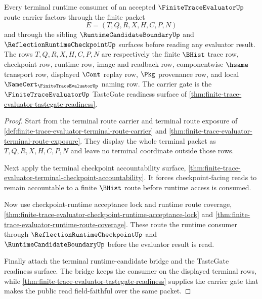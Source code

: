 \begin{theorem}
\label{thm:finite-trace-evaluator-terminal-runtime-consumer-factorization}
Every terminal runtime consumer of an accepted $\FiniteTraceEvaluatorUp$
route carrier factors through the finite packet
$$
E=(T,Q,R,X,H,C,P,N)
$$
and through the sibling $\RuntimeCandidateBoundaryUp$ and
$\ReflectionRuntimeCheckpointUp$ surfaces before reading any evaluator result.
The rows $T,Q,R,X,H,C,P,N$ are respectively the finite $\BHist$ trace row,
checkpoint row, runtime row, image and readback row, componentwise $\hsame$
transport row, displayed $\Cont$ replay row, $\Pkg$ provenance row, and local
$\NameCert_{\FiniteTraceEvaluatorUp}$ naming row. The carrier gate is the
$\FiniteTraceEvaluatorUp$ TasteGate readiness surface of
\autoref{thm:finite-trace-evaluator-tastegate-readiness}.
\end{theorem}
\begin{proof}
Start from the terminal route carrier and terminal route exposure of
\autoref{def:finite-trace-evaluator-terminal-route-carrier} and
\autoref{thm:finite-trace-evaluator-terminal-route-exposure}. They display the
whole terminal packet as $T,Q,R,X,H,C,P,N$ and leave no terminal coordinate
outside those rows.

Next apply the terminal checkpoint accountability surface,
\autoref{thm:finite-trace-evaluator-terminal-checkpoint-accountability}. It
forces checkpoint-facing reads to remain accountable to a finite $\BHist$
route before runtime access is consumed.

Now use checkpoint-runtime acceptance lock and runtime route coverage,
\autoref{thm:finite-trace-evaluator-checkpoint-runtime-acceptance-lock} and
\autoref{thm:finite-trace-evaluator-runtime-route-coverage}. These route the
runtime consumer through $\ReflectionRuntimeCheckpointUp$ and
$\RuntimeCandidateBoundaryUp$ before the evaluator result is read.

Finally attach the terminal runtime-candidate bridge and the TasteGate
readiness surface. The bridge keeps the consumer on the displayed terminal
rows, while \autoref{thm:finite-trace-evaluator-tastegate-readiness} supplies
the carrier gate that makes the public read field-faithful over the same
packet.
\end{proof}

